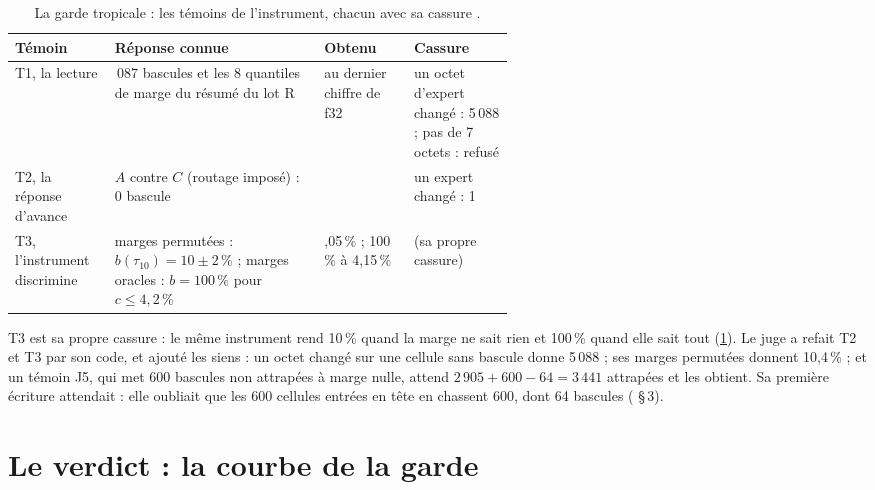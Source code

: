 \begin{table}[tbp]
\centering\small
\caption[La garde tropicale : les témoins]{La garde tropicale : les témoins de l'instrument, chacun avec sa cassure \mes.}
\label{t3tro:tab:temoins}
\renewcommand{\arraystretch}{1.1}
\begin{tabularx}{\linewidth}{@{}>{\raggedright\arraybackslash}p{0.2\linewidth}>{\raggedright\arraybackslash}X>{\raggedright\arraybackslash}p{0.18\linewidth}>{\raggedright\arraybackslash}p{0.2\linewidth}@{}}
\toprule
Témoin & Réponse connue & Obtenu & Cassure \\
\midrule
T1, la lecture & 5\,087 bascules et les 8 quantiles de marge du résumé du lot R & au dernier chiffre de f32 & un octet d'expert changé : 5\,088 ; pas de 7 octets : refusé \\
T2, la réponse d'avance & $A$ contre $C$ (routage imposé) : 0 bascule & 0 & un expert changé : 1 \\
T3, l'instrument discrimine & marges permutées : $b(\tau_{10}) = 10 \pm 2\,\%$ ; marges oracles : $b = 100\,\%$ pour $c \le 4{,}2\,\%$ & 10,05\,\% ; 100\,\% à 4,15\,\% & (sa propre cassure) \\
\bottomrule
\end{tabularx}
\end{table}

T3 est sa propre cassure : le même instrument rend 10\,\% quand la marge ne sait rien et 100\,\% quand elle sait tout (\cref{t3tro:tab:temoins}). Le juge a refait T2 et T3 par son code, et ajouté les siens : un octet changé sur une cellule sans bascule donne 5\,088 ; ses marges permutées donnent 10,4\,\% ; et un témoin J5, qui met 600 bascules non attrapées à marge nulle, attend $2\,905 + 600 - 64 = 3\,441$ attrapées et les obtient. Sa première écriture attendait  : elle oubliait que les 600 cellules entrées en tête en chassent 600, dont 64 bascules ( §\,3).

\section{Le verdict : la courbe de la garde}\label{t3tro:sec:verdict}

